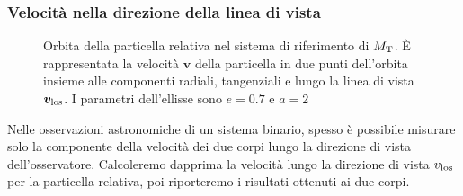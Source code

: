 {\subsubsection{Velocità nella direzione della linea di vista}
\label{sec:velocita-linea-di-vista}

\begin{figure}[tb]
  \centering
  
  \caption[Velocità nella direzione della linea di vista]{Orbita della
    particella relativa nel sistema di riferimento di $M_\textup{T}$. È
    rappresentata la velocità $\bm{v}$ della particella in due punti dell'orbita
    insieme alle componenti radiali, tangenziali e lungo la linea di vista
    $\bm{v}_\textup{los}$. I parametri dell'ellisse sono $e=0.7$ e $a=2$}
  \label{fig:ellisse-vlos}
\end{figure}
Nelle osservazioni astronomiche di un sistema binario, spesso è possibile
misurare solo la componente della velocità dei due corpi lungo la direzione di
vista dell'osservatore. Calcoleremo dapprima la velocità lungo la direzione di
vista $v_\textup{los}$ per la particella relativa, poi riporteremo i risultati
ottenuti ai due corpi.

}
